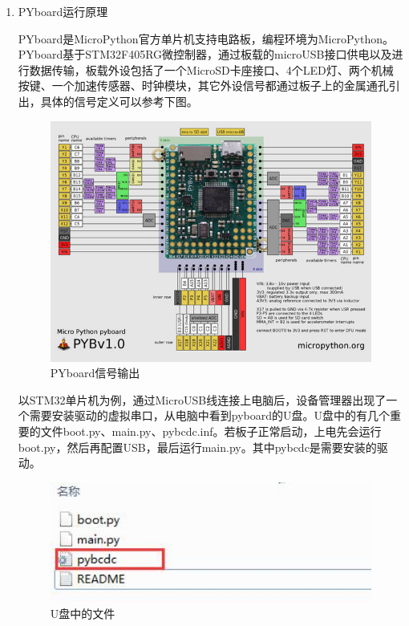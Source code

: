 \documentclass[UTF-8,12pt,a4paper]{ctexart}
\begin{document}
\begin{enumerate}[(1)]
\item PYboard运行原理

      PYboard是MicroPython官方单片机支持电路板，编程环境为MicroPython。PYboard基于STM32F405RG微控制器，通过板载的microUSB接口供电以及进行数据传输，板载外设包括了一个MicroSD卡座接口、4个LED灯、两个机械按键、一个加速传感器、时钟模块，其它外设信号都通过板子上的金属通孔引出，具体的信号定义可以参考下图。

      \begin{figure}[H]
      \centering
      \includegraphics[width=12cm]{3_pyboard.jpg}
      \caption{PYboard信号输出}
      \label{PYboard信号输出}
      \end{figure}

      以STM32单片机为例，通过MicroUSB线连接上电脑后，设备管理器出现了一个需要安装驱动的虚拟串口，从电脑中看到pyboard的U盘。U盘中的有几个重要的文件boot.py、main.py、pybcdc.inf。若板子正常启动，上电先会运行boot.py，然后再配置USB，最后运行main.py。其中pybcdc是需要安装的驱动。

      \begin{figure}[H]
      \centering
      \includegraphics[width=12cm]{3_upan.jpg}
      \caption{U盘中的文件}
      \label{U盘中的文件}
      \end{figure}


\end{enumerate}
\end{document}
